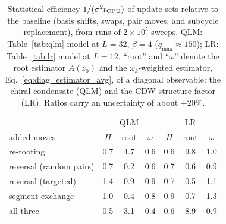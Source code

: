 \begin{table}[t]
\caption{Statistical efficiency $1/(\sigma^2 t_{\rm CPU})$ of update sets relative to the baseline (basis shifts, swaps, pair moves, and subcycle replacement), from runs of $2\times10^5$ sweeps. QLM: Table~\ref{tab:qlm} model at $L=32$, $\beta=4$ ($q_{\max}\approx150$); LR: Table~\ref{tab:lr} model at $L=12$. ``root'' and ``$\omega$'' denote the root estimator $A(z_0)$ and the $\omega_k$-weighted estimator, Eq.~\eqref{eq:diag_estimator_avg}, of a diagonal observable: the chiral condensate (QLM) and the CDW structure factor (LR). Ratios carry an uncertainty of about $\pm20\%$.}
\label{tab:nl}
\begin{tabular}{l|ccc|ccc}
\hline\hline
 & \multicolumn{3}{c|}{QLM} & \multicolumn{3}{c}{LR}\\
added moves & $H$ & root & $\omega$ & $H$ & root & $\omega$\\
\hline
re-rooting & 0.7 & 4.7 & 0.6 & 0.6 & 9.8 & 1.0 \\
reversal (random pairs) & 0.7 & 0.2 & 0.6 & 0.7 & 0.6 & 0.9 \\
reversal (targeted) & 1.4 & 0.9 & 0.9 & 0.7 & 0.5 & 1.1 \\
segment exchange & 1.0 & 0.4 & 0.8 & 0.9 & 0.7 & 1.3 \\
all three & 0.5 & 3.1 & 0.4 & 0.6 & 8.9 & 0.9 \\
\hline\hline
\end{tabular}
\end{table}
